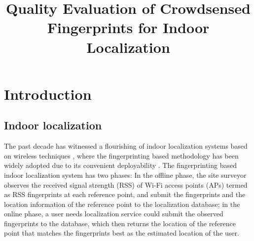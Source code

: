 \documentclass[10pt,conference,compsocconf,letterpaper]{IEEEtran}
\begin{document}
\title{Quality Evaluation of Crowdsensed Fingerprints for Indoor Localization}

%
%

\maketitle



\begin{abstract}

\end{abstract}


\section{Introduction}\label{sectionintro}

\subsection{Indoor localization}
The past decade has witnessed a flourishing of indoor localization systems based on wireless techniques \cite{ rsscsi}, where the fingerprinting based methodology has been widely adopted due to its convenient deployability \cite{ mobicom04, horus }. The fingerprinting based indoor localization system has two phases: In the offline phase, the site surveyor observes the received signal strength (RSS) of Wi-Fi access points (APs) termed as RSS fingerprints at each reference point, and submit the fingerprints and the location information of the reference point to the localization database; in the online phase, a user needs localization service could submit the observed fingerprints to the database, which then returns the location of the reference point that matches the fingerprints best as the estimated location of the user.   
\end{document}
